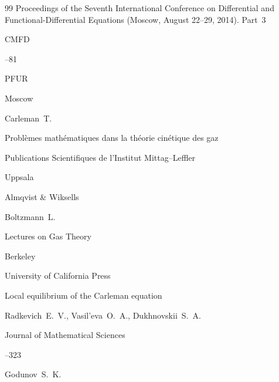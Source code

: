 \begin{thebibliography}{99}
\inbook Proceedings of the Seventh International Conference on Differential and Functional-Differential Equations \rm (Moscow, August 22--29, 2014). Part~3

\serial CMFD



--81

\publ PFUR

\publaddr Moscow




\by Carleman~T.

\book Problèmes mathématiques dans la théorie cin\'etique des gaz


\serial Publications Scientifiques de l’Institut Mittag--Leffler


\publaddr Uppsala

\publ Almqvist \& Wiksells 






\by Boltzmann~L.

\book Lectures on Gas Theory

\publaddr Berkeley

\publ University of California Press








\paper Local equilibrium of the Carleman equation

\by Radkevich~E.~V., Vasil'eva~O.~A., Dukhnovskii~S.~A.

\jour Journal of Mathematical Sciences




--323





\by Godunov~S.~K.


\end{thebibliography}
